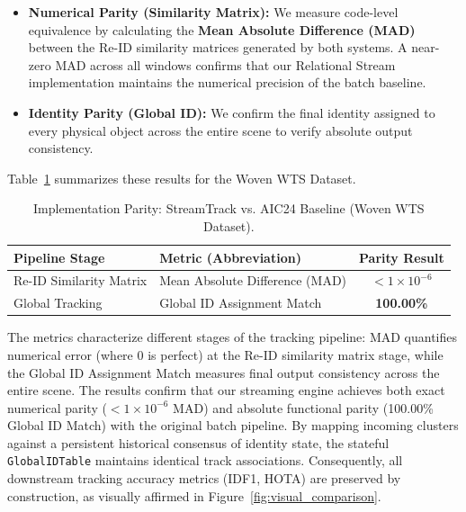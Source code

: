 \documentclass[review]{elsarticle}
\begin{document}
\begin{itemize}[leftmargin=*]
    \item \textbf{Numerical Parity (Similarity Matrix):} We measure code-level equivalence by calculating the \textbf{Mean Absolute Difference (MAD)} between the Re-ID similarity matrices generated by both systems. A near-zero MAD across all windows confirms that our Relational Stream implementation maintains the numerical precision of the batch baseline.
    \item \textbf{Identity Parity (Global ID):} We confirm the final identity assigned to every physical object across the entire scene to verify absolute output consistency.
\end{itemize}

Table~\ref{tab:parity_metrics} summarizes these results for the Woven WTS Dataset.

\begin{table}[H]
    \centering
    \caption{Implementation Parity: StreamTrack vs. AIC24 Baseline (Woven WTS Dataset).}
    \label{tab:parity_metrics}
    \begin{tabular}{@{}llc@{}}
        \toprule
        \textbf{Pipeline Stage} & \textbf{Metric (Abbreviation)} & \textbf{Parity Result} \\ \midrule
        Re-ID Similarity Matrix & Mean Absolute Difference (MAD) & $< 1 \times 10^{-6}$ \\ \hline
        Global Tracking & Global ID Assignment Match & \textbf{100.00\%} \\ \bottomrule
    \end{tabular}
\end{table}

The metrics characterize different stages of the tracking pipeline: MAD quantifies numerical error (where $0$ is perfect) at the Re-ID similarity matrix stage, while the Global ID Assignment Match measures final output consistency across the entire scene. The results confirm that our streaming engine achieves both exact numerical parity ($< 1 \times 10^{-6}$ MAD) and absolute functional parity (100.00\% Global ID Match) with the original batch pipeline. By mapping incoming clusters against a persistent historical consensus of identity state, the stateful \texttt{GlobalIDTable} maintains identical track associations. Consequently, all downstream tracking accuracy metrics (IDF1, HOTA) are preserved by construction, as visually affirmed in Figure~\ref{fig:visual_comparison}. 
\end{document}
